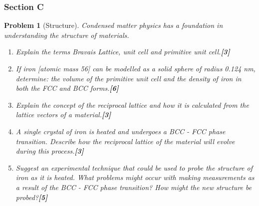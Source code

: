 \documentclass[a4paper]{article}
\theoremstyle{new}
\newtheorem{qns}{Problem}[subsection]
\begin{document}
\subsubsection{Section C}
\begin{qns}[Structure]
Condensed matter physics has a foundation in understanding the structure of materials.
\begin{enumerate}[label=(\alph*)]
\item Explain the terms Bravais Lattice, unit cell and primitive unit cell.\hfill\textbf{[3]}
\item If iron [atomic mass 56] can be modelled as a solid sphere of radius 0.124 nm, determine: the volume of the primitive unit cell and the density of iron in both the FCC and BCC forms.\hfill\textbf{[6]}
\item Explain the concept of the reciprocal lattice and how it is calculated from the lattice vectors of a material.\hfill\textbf{[3]}
\item A single crystal of iron is heated and undergoes a BCC - FCC phase transition. Describe how the reciprocal lattice of the material will evolve during this process.\hfill\textbf{[3]}
\item Suggest an experimental technique that could be used to probe the structure of iron as it is heated. What problems might occur with making measurements as a result of the BCC - FCC phase transition? How might the new structure be probed?\hfill\textbf{[5]}
\end{enumerate}
\end{qns}
\end{document}
